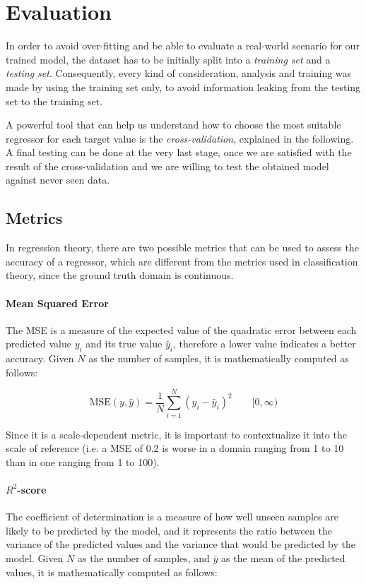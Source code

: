 \section{Evaluation}\label{sec:evaluation}

In order to avoid over-fitting and be able to evaluate a real-world scenario for our trained model, the dataset has to be initially split into a \emph{training set} and a \emph{testing set}.
Consequently, every kind of consideration, analysis and training was made by using the training set only, to avoid information leaking from the testing set to the training set.

A powerful tool that can help us understand how to choose the most suitable regressor for each target value is the \emph{cross-validation}, explained in the following.
A final testing can be done at the very last stage, once we are satisfied with the result of the cross-validation and we are willing to test the obtained model against never seen data.

\subsection{Metrics}\label{sec:metrics}

In regression theory, there are two possible metrics that can be used to assess the accuracy of a regressor, which are different from the metrics used in classification theory, since the ground truth domain is continuous.

\paragraph{Mean Squared Error}
The MSE is a measure of the expected value of the quadratic error between each predicted value $y_i$ and its true value $\hat{y}_i$, therefore a lower value indicates a better accuracy.
Given $N$ as the number of samples, it is mathematically computed as follows:

\[
	\text{MSE}(y, \hat{y}) = \frac{1}{N} \sum_{i=1}^{N} (y_i - \hat{y}_i)^2
	\qquad [0, \infty)
\]

Since it is a scale-dependent metric, it is important to contextualize it into the scale of reference (i.e. a MSE of 0.2 is worse in a domain ranging from 1 to 10 than in one ranging from 1 to 100).

\paragraph{$R^2$-score}
The coefficient of determination is a measure of how well unseen samples are likely to be predicted by the model, and it represents the ratio between the variance of the predicted values and the variance that would be predicted by the model.
Given $N$ as the number of samples, and $\bar{y}$ as the mean of the predicted values, it is mathematically computed as follows:

